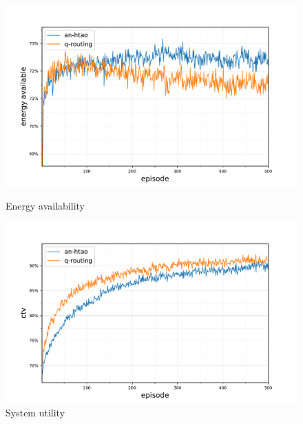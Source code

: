 \begin{figure}[ht]
	\begin{minipage}{.49\textwidth}
		\centering
		\includegraphics[width=1.0\linewidth,trim={25pt 0pt 50pt 0pt},clip]{520comparison_ctv-statistics-energy-available-comparison}
		\captionsetup{labelfont=bf,singlelinecheck=on}
		\caption{Energy availability}
		\label{fig:520comparison_ctv-statistics-energy-available-comparison}
	\end{minipage}
	\begin{minipage}{.49\textwidth}
	\centering
	\includegraphics[width=1.0\linewidth,trim={25pt 0pt 50pt 0pt},clip]{520balanced_ctv-optimal-ctv}
	\captionsetup{labelfont=bf,singlelinecheck=on}
	\caption{System utility}
	\label{fig:520balanced_ctv-optimal-ctv}
\end{minipage}\hfill%
\end{figure}


